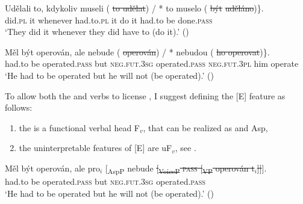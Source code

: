 \documentclass[output=paper,colorlinks,citecolor=brown,]{langsci/langscibook}
\begin{document}
\ea \label{35}
\ea \label{35a}
\gll Udělali to, kdykoliv   \minsp{\{} museli  (\hspace{-2pt} \sout{to udělat}) / *\hspace{-2pt} to muselo \hspace{2cm} (\hspace{-2pt} \sout{být} \sout{uděláno})\}.\\
 did.\textsc{pl}  it   whenever {} had.to.\textsc{pl} {} {it do} {} {} it  had.to  {} {} be done.\textsc{pass}\\
\glt `They did it whenever they did have to (do it).'  \hfill ()

\ex \label{35b}
\gll Měl být operován, ale \minsp{\{} nebude (\hspace{-2pt} \sout{operován}) { } / \hspace{1.3cm} *\hspace{-2pt} nebudou (\hspace{-2pt} \sout{ho { } operovat})\}.\\
had.to be operated.\textsc{pass} but {} \textsc{neg}.\textsc{fut}.\textsc{3sg}  {} operated.\textsc{pass} {} {} {} {} \textsc{neg}.\textsc{fut}.3\textsc{pl} {} {him operate}\\
\glt  `He had to be operated but he will not (be operated).'  \hfill ()
\z \z

\noindent To allow both the  and  verbs to license , I suggest defining the [E] feature as follows:
\begin{enumerate}
    \item the  is a functional verbal head F$_{v}$, that can be realized as  and Asp,
    \item the uninterpretable features of [E] are uF$_{v}$, see .
\end{enumerate}

\begin{exe}
\ex \label{36}
\gll Měl být  operován, ale pro$_{i}$ [\textsubscript{AspP} nebude \sout{[\textsubscript{VoiceP} \textsc{pass} [\textsubscript{VP} operován t$_{i}$]]}].\\
had.to be   operated.\textsc{pass} but {} {} \textsc{neg}.\textsc{fut}.\textsc{3sg} {{ } { } { } { } { } { } { } { } { } { } { } { } { }operated.\textsc{pass}} \\
\glt `He had to be operated but he will not (be operated).'  \hfill ()
\end{exe}
\end{document}
